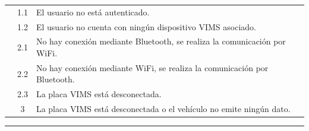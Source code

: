 \begin{table}[H]
\begin{tabularx}{\textwidth}{|c|c|X|}
                                               & 1.1                                                                                                                   & \multicolumn{1}{L|}{El usuario no está autenticado.}                                                                       \\
    \cline{2-3}
                                               & 1.2                                                                                                                   & \multicolumn{1}{L|}{El usuario no cuenta con ningún dispositivo \ac{VIMS} asociado.}                                       \\
    \cline{2-3}
                                               & 2.1                                                                                                                   & \multicolumn{1}{L|}{No hay conexión mediante Bluetooth, se realiza la comunicación por WiFi.}                              \\
    \cline{2-3}
                                               & 2.2                                                                                                                   & \multicolumn{1}{L|}{No hay conexión mediante WiFi, se realiza la comunicación por Bluetooth.}                              \\
    \cline{2-3}
                                               & 2.3                                                                                                                   & \multicolumn{1}{L|}{La placa \ac{VIMS} está desconectada.}                                                                 \\
    \cline{2-3}
                                               & 3                                                                                                                     & \multicolumn{1}{L|}{La placa \ac{VIMS} está desconectada o el vehículo no emite ningún dato.}                              \\
    \hline
  \end{tabularx}
\end{table}

\noindent\rule{\linewidth}{.2pt}

